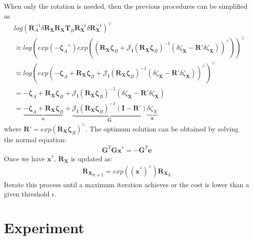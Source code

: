 When only the rotation is needed, then the previous procedures can be simplified as
\begin{align}
&log \left( \mathbf{R}_{A}^{-1}{\delta\mathbf{R}_{\mathbf{X}}}\mathbf{R}_\mathbf{X}\mathbf{T}_{B}\mathbf{R}_{\mathbf{X}}^{-1}{\delta\mathbf{R}_{\mathbf{X}}^{-1}} \right)^{\vee} \\
&\approx log
\left( 
	exp\left(-{\mathbf{\zeta}_A}^{\wedge}\right) exp
\left(
\left( 
	\mathbf{R}_\mathbf{X}{\mathbf{\zeta}_B} + \mathbf{\mathcal{J}_{l}}
\left(
	\mathbf{R}_\mathbf{X}{\mathbf{\zeta}_B}
\right) ^{-1} 
\left( 
	\delta \zeta_{\mathbf{X}} - \mathbf{R}' \delta \zeta_{\mathbf{X}}
\right)
\right)^{\wedge}
\right)
\right)^{\vee} \\
&\approx log
\left(
	exp 
\left(
	-{\mathbf{\zeta}_A}+\mathbf{R}_\mathbf{X}{\mathbf{\zeta}_B} + \mathbf{\mathcal{J}_{l}}
\left(
	\mathbf{R}_\mathbf{X}{\mathbf{\zeta}_B}
\right) ^{-1} 
\left( 
	\delta \zeta_{\mathbf{X}} - \mathbf{R}' \delta \zeta_{\mathbf{X}}
\right) 
\right)^{\wedge}
\right)^{\vee} \\
&=-{\mathbf{\zeta}_A}+\mathbf{R}_\mathbf{X}{\mathbf{\zeta}_B} + \mathbf{\mathcal{J}_{l}}
\left(
	\mathbf{R}_\mathbf{X}{\mathbf{\zeta}_B}
\right) ^{-1} 
\left( 
	\delta \zeta_{\mathbf{X}} - \mathbf{R}' \delta \zeta_{\mathbf{X}}
\right) \\
&=\underbrace{-{\mathbf{\zeta}_A}+\mathbf{R}_\mathbf{X}{\mathbf{\zeta}_B}}_{\mathbf{e}} + \underbrace{\mathbf{\mathcal{J}_{l}}
\left(
	\mathbf{R}_\mathbf{X}{\mathbf{\zeta}_B}
\right) ^{-1} 
\left( 
\mathbf{I} - \mathbf{R}' 
\right)}_{\mathbf{G}} \underbrace{\delta \zeta_{X}}_{\mathbf{x}}
\end{align}
where $\mathbf{R}' = exp\left(\mathbf{R}_\mathbf{X}{\mathbf{\zeta}_B}\right)^{\wedge}$.
The optimum solution can be obtained by solving the normal equation:
\begin{align}
\mathbf{G}^T\mathbf{G}\mathbf{x}^*=-\mathbf{G}^T\mathbf{e}
\end{align}
Once we have $\mathbf{x}^*$, $\mathbf{R}_{\mathbf{X}}$ is updated as:
\begin{align}
{\mathbf{R}_{\mathbf{X}}}_{k+1}=exp\left(\left(\mathbf{x}^*\right)^{\wedge}\right){\mathbf{R}_{\mathbf{X}}}_k
\end{align}
Iterate this process until a maximum iteration achieves or the cost is lower than a given threshold $\epsilon$.
\section{Experiment}
